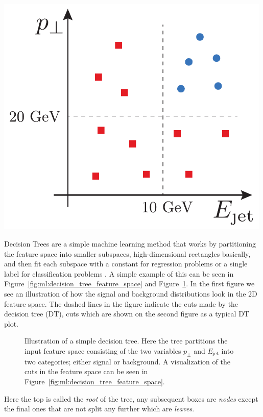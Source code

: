 \begin{marginfigure}
  \includegraphics[width=0.99\textwidth, trim=10 10 10 10, clip]{figures/decision_tree/tree_example.pdf}%
  \caption[Decision Tree Cuts In Feature Space]{Illustration of the cuts a decision tree model make for \textcolor{blue}{signal} in blue circles and \textcolor{red}{background} in red squares. This is an visualization in the feature space of the decision tree seen in Figure~\ref{fig:ml:decision_tree}.}
  \label{fig:ml:decision_tree_feature_space}
\end{marginfigure}

Decision Trees are a simple machine learning method that works by partitioning the feature space into smaller subspaces, high-dimensional rectangles basically, and then fit each subspace with a constant for regression problems or a single label for classification problems \citep{hastieElementsStatisticalLearning2009}. A simple example of this can be seen in Figure~\ref{fig:ml:decision_tree_feature_space} and Figure~\ref{fig:ml:decision_tree}. In the first figure we see an illustration of how the signal and background distributions look in the 2D feature space. The dashed lines in the figure indicate the cuts made by the decision tree (DT), cuts which are shown on the second figure as a typical DT plot. 
\begin{figure}
  \centering
  \caption[Decision Tree]{
    Illustration of a simple decision tree. Here the tree partitions the input feature space consisting of the two variables $p_\perp$ and $E_\mathrm{jet}$ into two categories; either signal or background. A visualization of the cuts in the feature space can be seen in Figure~\ref{fig:ml:decision_tree_feature_space}.
  }
  \label{fig:ml:decision_tree}
\end{figure}
Here the top  is called the \emph{root} of the tree, any subsequent boxes are \emph{nodes} except the final ones that are not split any further which are \emph{leaves}.

